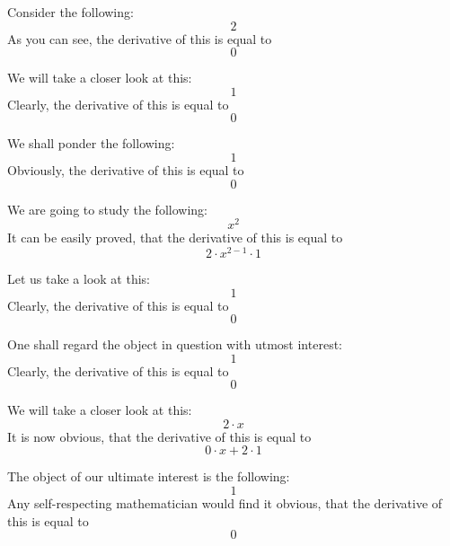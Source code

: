 \documentclass{article}
\begin{document}
Consider the following:
\begin{equation}
2 
\end{equation}
As you can see, the derivative of this is equal to
\begin{equation}
0 
\end{equation}

We will take a closer look at this:
\begin{equation}
1 
\end{equation}
Clearly, the derivative of this is equal to
\begin{equation}
0 
\end{equation}

We shall ponder the following:
\begin{equation}
1 
\end{equation}
Obviously, the derivative of this is equal to
\begin{equation}
0 
\end{equation}

We are going to study the following:
\begin{equation}
x ^{2 } 
\end{equation}
It can be easily proved, that the derivative of this is equal to
\begin{equation}
2 \cdot x ^{2 - 1 } \cdot 1 
\end{equation}

Let us take a look at this:
\begin{equation}
1 
\end{equation}
Clearly, the derivative of this is equal to
\begin{equation}
0 
\end{equation}

One shall regard the object in question with utmost interest:
\begin{equation}
1 
\end{equation}
Clearly, the derivative of this is equal to
\begin{equation}
0 
\end{equation}

We will take a closer look at this:
\begin{equation}
2 \cdot x 
\end{equation}
It is now obvious, that the derivative of this is equal to
\begin{equation}
0 \cdot x + 2 \cdot 1 
\end{equation}

The object of our ultimate interest is the following:
\begin{equation}
1 
\end{equation}
Any self-respecting mathematician would find it obvious, that the derivative of this is equal to
\begin{equation}
0 
\end{equation}
\end{document}
